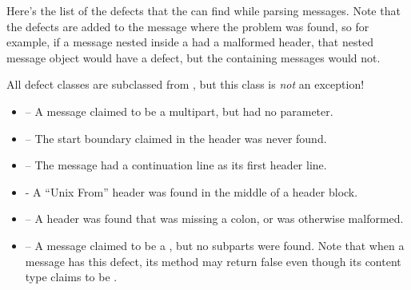 Here's the list of the defects that the  can find while
parsing messages.  Note that the defects are added to the message where the
problem was found, so for example, if a message nested inside a
 had a malformed header, that nested message
object would have a defect, but the containing messages would not.

All defect classes are subclassed from , but
this class is \emph{not} an exception!


\begin{itemize}
\item {} -- A message claimed to be a
      multipart, but had no  parameter.

\item {} -- The start boundary claimed in the
       header was never found.

\item {} -- The message had a
      continuation line as its first header line.

\item {} - A ``Unix From'' header was found
      in the middle of a header block.

\item {} -- A header was found that was missing a
      colon, or was otherwise malformed.

\item {} -- A message claimed to be a
      , but no subparts were found.  Note that when a
      message has this defect, its  method may return
      false even though its content type claims to be .
\end{itemize}
